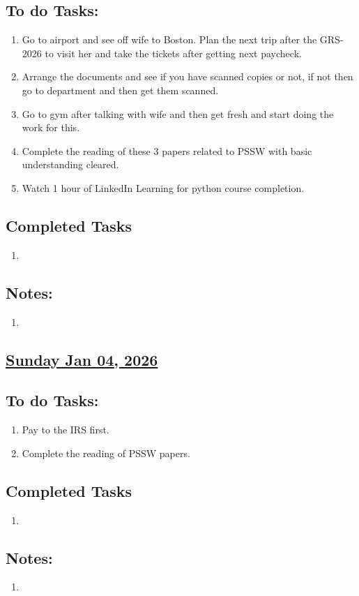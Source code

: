 \subsection*{To do Tasks:}
\begin{enumerate}
    \item Go to airport and see off wife to Boston. Plan the next trip after the GRS-2026 to visit her and take the tickets after getting next paycheck.
    \item Arrange the documents and see if you have scanned copies or not, if not then go to department and then get them scanned. 
    \item Go to gym after talking with wife and then get fresh and start doing the work for this. 
    \item Complete the reading of these 3 papers related to PSSW with basic understanding cleared. 
    \item Watch 1 hour of LinkedIn Learning for python course completion.
\end{enumerate}
\subsection*{Completed Tasks}
\begin{enumerate}[\ding{52}]  %
    \item 
\end{enumerate}
\subsection*{Notes:}
\begin{enumerate}
    \item 
\end{enumerate}
\subsection*{\underline{Sunday Jan 04, 2026} }
\subsection*{To do Tasks:}
\begin{enumerate}
    \item Pay to the IRS first. \cmark
    \item Complete the reading of PSSW papers.
\end{enumerate}
\subsection*{Completed Tasks}
\begin{enumerate}[\ding{52}]  %
    \item 
\end{enumerate}
\subsection*{Notes:}
\begin{enumerate}
    \item 
\end{enumerate}
\starredline



